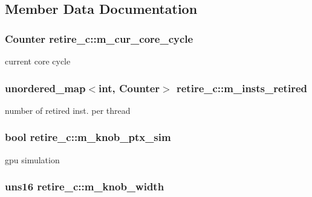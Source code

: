 \subsection{Member Data Documentation}
\hypertarget{classretire__c_af58d8582170f634d4f021b76fd958b01}{
\subsubsection[{m\_\-cur\_\-core\_\-cycle}]{\setlength{\rightskip}{0pt plus 5cm}Counter {\bf retire\_\-c::m\_\-cur\_\-core\_\-cycle}}}
\label{classretire__c_af58d8582170f634d4f021b76fd958b01}
current core cycle \hypertarget{classretire__c_a84318556bf044a1c3bdbd08f61fe2d3a}{
\subsubsection[{m\_\-insts\_\-retired}]{\setlength{\rightskip}{0pt plus 5cm}unordered\_\-map$<$int, Counter$>$ {\bf retire\_\-c::m\_\-insts\_\-retired}}}
\label{classretire__c_a84318556bf044a1c3bdbd08f61fe2d3a}
number of retired inst. per thread \hypertarget{classretire__c_a08f7427294d9f9d709beb52d33e98f41}{
\subsubsection[{m\_\-knob\_\-ptx\_\-sim}]{\setlength{\rightskip}{0pt plus 5cm}bool {\bf retire\_\-c::m\_\-knob\_\-ptx\_\-sim}}}
\label{classretire__c_a08f7427294d9f9d709beb52d33e98f41}
gpu simulation \hypertarget{classretire__c_ae0cb9e43818642ff68a1565004cd3080}{
\subsubsection[{m\_\-knob\_\-width}]{\setlength{\rightskip}{0pt plus 5cm}uns16 {\bf retire\_\-c::m\_\-knob\_\-width}}}
